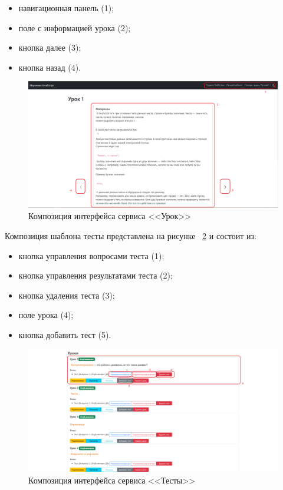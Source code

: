 \begin{itemize}
	\item навигационная панель (1);
	\item поле с информацией урока (2);
	\item кнопка далее (3);
	\item кнопка назад (4).
\end{itemize}

\begin{figure}[h]
	\centering
	\includegraphics[width=1\linewidth]{images/урок}
	\caption{Композиция интерфейса сервиса <<Урок>>}
	\label{templ:image4}
\end{figure}
\newpage
Композиция шаблона тесты представлена на рисунке ~\ref{templ:image5} и состоит из:

\begin{itemize}
	\item кнопка управления вопросами теста (1);
	\item кнопка управления результатами теста (2);
	\item кнопка удаления теста (3);
	\item поле урока (4);
	\item кнопка добавить тест (5).
\end{itemize}

\begin{figure}[h]
	\centering
	\includegraphics[width=1\linewidth]{images/Тесты}
	\caption{Композиция интерфейса сервиса <<Тесты>>}
	\label{templ:image5}
\end{figure}

